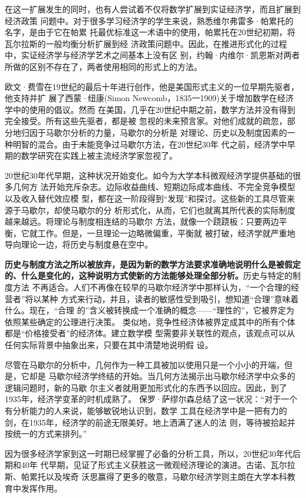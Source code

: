 在这一扩展发生的同时，也有人尝试着不仅将数学扩展到实证经济学，而且扩展到经济政策
问题中。对于很多学习经济学的学生来说，熟悉维尔弗雷多·帕累托的名字，是由于它在帕累
托最优标准这一术语中的使用，帕累托在20世纪初期，将瓦尔拉斯的一般均衡分析扩展到经
济政策问题中。因此，在推进形式化的过程中，实证经济学与经济学艺术之间基本上没有区
别，约翰·内维尔·凯恩斯对两者所做的区别不存在了，两者使用相同的形式上的方法。

欧文·费雪在19世纪的最后十年进行创作，他是美国形式主义的一位早期先驱者，他支持并扩
展了西蒙·纽康(Simon Newcomb，1835一1909)关于增加数学在经济学中的使用的倡议。然而
在美国，几乎在20世纪中期之前，数学方法并没有得到完全接受。所有这些先驱者，都是被
忽视的未来预言家。对他们成就的疏忽，部分地归因于马歇尔分析的力量，马歇尔的分析是
对理论、历史以及制度因素的一种明智的混合。由于未能竞争过马歇尔方法，在20世纪30年
代之前，经济学中早期的数学研究在实践上被主流经济学家忽视了。

20世纪30年代早期，这种状况开始变化。如今为大学本科微观经济学提供基础的很多几何方
法开始充斥杂志。边际收益曲线、短期边际成本曲线、不完全竞争模型以及收入替代效应模
型，都在这一阶段得到“发现”和探讨。这些新的工具尽管来源于马歇尔，却使马歇尔的分
析形式化，从而，它们也就离其所代表的实际制度越来越远。将理论与制度相连结的马歇尔
方法，就像一个跷跷板：只要两边平衡，它就工作。但是，一旦理论一边略微偏重，平衡就
被打破，经济学就严重地导向理论一边，将历史与制度悬在空中。

\textbf{历史与制度方法之所以被放弃，是因为新的数学方法要求准确地说明什么是被假定
  的、什么是变化的，这种说明方式使新的方法能够处理全部分析。}历史与特定的制度方法
不再适合。人们不再像在较早的马歇尔经济学中那样认为，“一个合理的经营者”将以某种
方式来行动，并且，读者的敏感性受到吸引，想知道“合理”意味着什么。现在，“合理
的”含义被转换成一个准确的概念——“理性的”，它被界定为依照某些确定的公理进行决策。
类似地，竞争性经济体被界定成其中的所有个体都是“价格接受者”的经济体。建立数学模
型需要非关联性的观点，该观点可以从任何实际背景中抽象出来，只要在其中清楚地说明假
设。

尽管在马歇尔的分析中，几何作为一种工具被加以使用只是一个小小的开端，但是，它却是
马歇尔经济学终结的开始。当几何方法揭示出马歇尔经济学中众多的逻辑问题时，新的马歇
尔主义者就用更加形式化的东西予以回应。因此，到了1935年，经济学变革的时机成熟了。
保罗·萨缪尔森总结了这一状况：“对于一个有分析能力的人来说，能够敏锐地认识到，数学
工具在经济学中是一把有力的剑，在1935年，经济学的前途无限美好。地上洒满了迷人的法
则，等待被拾起并按统一的方式来排列。”

因为很多经济学家到这一时期已经掌握了必备的分析工具，所以，20世纪30年代后期和40年
代早期，见证了形式主义获胜这一微观经济理论的演进。古诺、瓦尔拉斯、帕累托以及埃奇
沃思赢得了更多的敬意，马歇尔经济学则主朗在大学本科教育中发挥作用。

